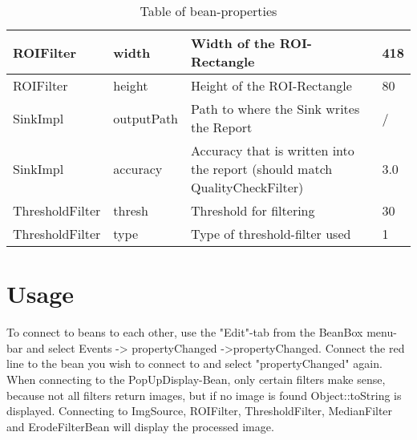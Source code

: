 \documentclass[a4paper, 11pt]{scrreprt}
\begin{document}
\begin{table}[H]
{\begin{tabular}{|l|l|l|l|}
            ROIFilter & width & Width of the ROI-Rectangle & 418                                                             \\ \hline
            ROIFilter & height & Height of the ROI-Rectangle & 80                                                             \\ \hline
            SinkImpl & outputPath & Path to where the Sink writes the Report & /                                                            \\ \hline
            SinkImpl & accuracy & Accuracy that is written into the report (should match QualityCheckFilter) & 3.0                                                             \\ \hline
            ThresholdFilter & thresh & Threshold for filtering & 30                                                          \\ \hline
            ThresholdFilter & type & Type of threshold-filter used & 1                                                           \\ \hline
        \end{tabular}%
        }
        \caption{Table of bean-properties}
        \label{tab:args-table}
    \end{table}
    \chapter*{Usage}
    To connect to beans to each other, use the "Edit"-tab from the BeanBox menu-bar and select Events -> propertyChanged
    ->propertyChanged. \newline Connect the red line to the bean you wish to connect to and select "propertyChanged" again.\newline
    When connecting to the PopUpDisplay-Bean, only certain filters make sense, because not all filters return images, but if no image is found Object::toString is displayed.\newline
    Connecting to ImgSource, ROIFilter, ThresholdFilter, MedianFilter and ErodeFilterBean will display the processed image.
\end{document}
